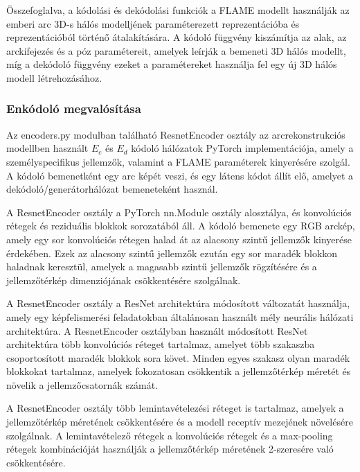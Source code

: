 \documentclass[12pt,a4]{article}
\begin{document}
\begin{enumerate}
\begin{enumerate}
        \end{enumerate}

        Összefoglalva, a kódolási és dekódolási funkciók a FLAME modellt használják az emberi arc 3D-s hálós modelljének paraméterezett reprezentációba és reprezentációból történő átalakítására. 
A kódoló függvény kiszámítja az alak, az arckifejezés és a póz paramétereit, amelyek leírják a bemeneti 3D hálós modellt, míg a dekódoló függvény ezeket a paramétereket használja fel egy új 3D hálós modell létrehozásához.

    \end{enumerate}

     \subsubsection{Enkódoló megvalósítása}
    Az encoders.py modulban található ResnetEncoder osztály az arcrekonstrukciós modellben használt $E_c$ és $E_d$ kódoló hálózatok PyTorch implementációja, amely a személyspecifikus jellemzők, valamint a FLAME paraméterek kinyerésére szolgál. 
     A kódoló bemenetként egy arc képét veszi, és egy látens kódot állít elő, amelyet a dekódoló/generátorhálózat bemeneteként használ.

A ResnetEncoder osztály a PyTorch nn.Module osztály alosztálya, és konvolúciós rétegek és reziduális blokkok sorozatából áll.
 A kódoló bemenete egy RGB arckép, amely egy sor konvolúciós rétegen halad át az alacsony szintű jellemzők kinyerése érdekében.
 Ezek az alacsony szintű jellemzők ezután egy sor maradék blokkon haladnak keresztül, amelyek a magasabb szintű jellemzők rögzítésére és a jellemzőtérkép dimenziójának csökkentésére szolgálnak.

A ResnetEncoder osztály a ResNet architektúra módosított változatát használja, amely egy képfelismerési feladatokban általánosan használt mély neurális hálózati architektúra.
 A ResnetEncoder osztályban használt módosított ResNet architektúra több konvolúciós réteget tartalmaz, amelyet több szakaszba csoportosított maradék blokkok sora követ.
 Minden egyes szakasz olyan maradék blokkokat tartalmaz, amelyek fokozatosan csökkentik a jellemzőtérkép méretét és növelik a jellemzőcsatornák számát.

A ResnetEncoder osztály több lemintavételezési réteget is tartalmaz, amelyek a jellemzőtérkép méretének csökkentésére és a modell receptív mezejének növelésére szolgálnak.
A lemintavételező rétegek a konvolúciós rétegek és a max-pooling rétegek kombinációját használják a jellemzőtérkép méretének 2-szeresére való csökkentésére.
\end{document}
